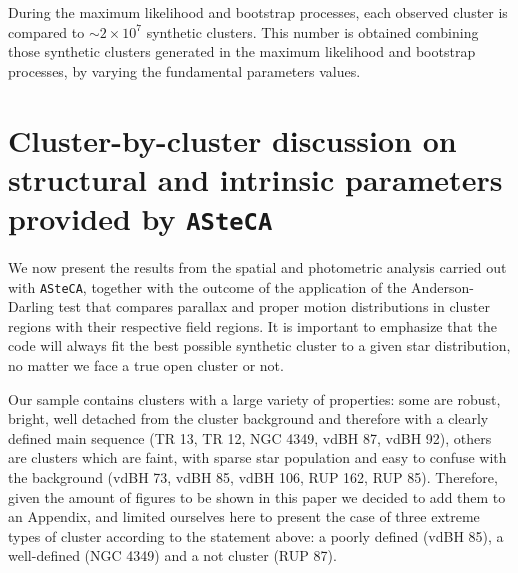 \documentclass[draft]{aa}
\begin{document}
During the maximum likelihood and bootstrap processes,
each observed cluster is compared to $\sim2\times10^7$
synthetic clusters. This number is obtained combining those synthetic
clusters generated in the maximum likelihood and bootstrap processes, by
varying the fundamental parameters values.




\section{Cluster-by-cluster discussion on structural and intrinsic parameters
provided by \texttt{ASteCA}}
\label{sec:cluster_discuss}

We now present the results from the spatial and photometric analysis
carried out with \texttt{ASteCA}, together with the outcome of the application
of the Anderson-Darling test that compares parallax and proper motion
distributions in cluster regions with their respective field regions.
It is important to emphasize that the code will always fit the
best possible synthetic cluster to a given star distribution, no matter we
face a true open cluster or not.

Our sample contains clusters with a large variety of properties: some are
robust, bright, well detached from the cluster background and therefore with a
clearly defined main sequence (TR 13, TR 12, NGC 4349, vdBH 87, vdBH 92),
others are clusters which are faint, with sparse star population and easy to
confuse with the background (vdBH 73, vdBH 85, vdBH 106, RUP 162, RUP 85).
Therefore, given the amount of figures to be shown in this paper we decided to
add them to an Appendix, and limited ourselves here to present
the case of three extreme types of cluster according to the statement
above: a poorly defined (vdBH 85), a well-defined (NGC 4349) and a not
cluster (RUP 87).
\end{document}
